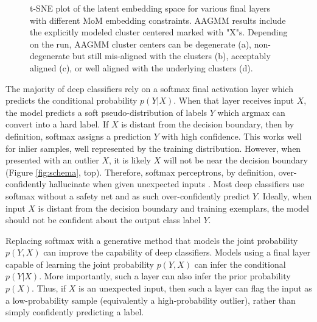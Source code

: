 \documentclass[10pt,twocolumn,letterpaper]{article}
\begin{document}
\begin{figure}[ht]
\begin{subfigure}[t]{.24\textwidth}
		\subcaption{}
	\end{subfigure}
	\caption{t-SNE\cite{tsne} plot of the latent embedding space for various final layers with different MoM embedding constraints. AAGMM results include the explicitly modeled cluster centered marked with "X"s. Depending on the run, AAGMM cluster centers can be degenerate (a), non-degenerate but still mis-aligned with the clusters (b), acceptably aligned (c), or well aligned with the underlying clusters (d).} 
	\label{fig:cifar10tsne}
\end{figure}

The majority of deep classifiers rely on a softmax final activation layer which predicts the conditional probability $p(Y|X)$.
When that layer receives input $X$, the model predicts a soft pseudo-distribution of labels $Y$ which argmax can convert into a hard label.
If $X$ is distant from the decision boundary, then by definition, softmax assigns a prediction $Y$ with high confidence.
This works well for inlier samples, well represented by the training distribution.
However, when presented with an outlier $X$, it is likely $X$ will not be near the decision boundary (Figure \ref{fig:schema}, top).
Therefore, softmax perceptrons, by definition, over-confidently hallucinate when given unexpected inputs \cite{wei2022mitigating}. 
Most deep classifiers use softmax without a safety net and as such over-confidently predict $Y$.
Ideally, when input $X$ is distant from the decision boundary and training exemplars, the model should not be confident about the output class label $Y$.

Replacing softmax with a generative method that models the joint probability $p(Y,X)$ can improve the capability of deep classifiers. 
Models using a final layer capable of learning the joint probability $p(Y,X)$ can infer the conditional $p(Y|X)$.
More importantly, such a layer can also infer the prior probability $p(X)$.
Thus, if $X$ is an unexpected input, then such a layer can flag the input as a low-probability sample (equivalently a high-probability outlier), rather than simply confidently predicting a label.
\end{document}
